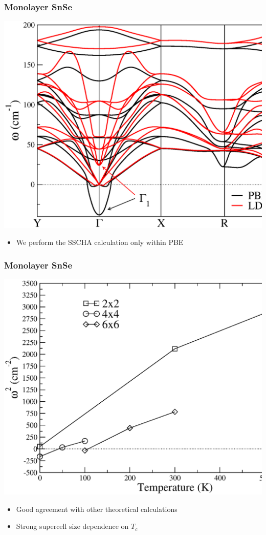 \documentclass{beamer}
\begin{document}
\begin{frame}

\frametitle{Monolayer SnSe}
\begin{center}
 \includegraphics[width=0.8\linewidth]{Pictures/MonoSnSe/harmonic-mono.eps}
\end{center}
\begin{itemize}
 \item We perform the SSCHA calculation only within PBE
\end{itemize}

\end{frame}


\begin{frame}

\frametitle{Monolayer SnSe}
\begin{center}
 \includegraphics[width=0.75\linewidth]{Pictures/MonoSnSe/freq-mono.eps}
\end{center}
\begin{itemize}
 \item Good agreement with other theoretical calculations
 \item Strong supercell size dependence on $T_{c}$
\end{itemize}

\end{frame}
\end{document}
